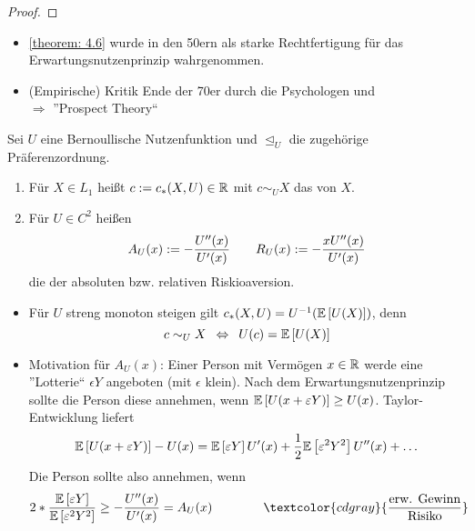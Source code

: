 \begin{proof}
\end{proof}

\begin{*bemerkung}
	\begin{itemize}[nolistsep]
		\item \cref{theorem: 4.6} wurde in den 50ern als starke Rechtfertigung für das Erwartungsnutzenprinzip wahrgenommen.
		\item (Empirische) Kritik Ende der 70er durch die Psychologen  und  \\
		$\Rightarrow$ ''Prospect Theory``
	\end{itemize}
\end{*bemerkung}

\begin{*definition}
	Sei $U$ eine Bernoullische Nutzenfunktion und $\unlhd_U$ die zugehörige Präferenzordnung.
	\begin{enumerate}[label=(\alph*)]
		\item Für $X \in L_1$ heißt $c \mathrel{:=} c_\ast(X,U) \in \mathbb{R}$ mit $c \sim_U X$ das  von $X$.
		\item Für $U \in C^2$ heißen
		\begin{equation*}
			A_U(x) \mathrel{:=} - \frac{U''(x)}{U'(x)} \qquad R_U(x) \mathrel{:=} -\frac{x U''(x)}{U'(x)}
		\end{equation*}
		die  der absoluten bzw. relativen Riskioaversion.
	\end{enumerate}
\end{*definition}

\begin{*bemerkung}
	\begin{itemize}
		\item Für $U$ streng monoton steigen gilt $c_\ast(X,U) = U^{-1}(\mathbb{E} \left[ U(X) \right])$, denn
		\begin{equation*}
			c \sim_U X \enskip \Leftrightarrow \enskip U(c) = \mathbb{E} \left[ U(X) \right]
		\end{equation*}
		\item Motivation für $A_U(x)$: Einer Person mit Vermögen $x \in \mathbb{R}$ werde eine ''Lotterie`` $\epsilon Y$ angeboten (mit $\epsilon$ klein). Nach dem Erwartungsnutzenprinzip sollte die Person diese annehmen, wenn $\mathbb{E} \left[ U(x + \varepsilon Y) \right] \ge U(x)$. Taylor-Entwicklung liefert
		\begin{equation*}
			\mathbb{E} \left[ U(x + \varepsilon Y) \right] - U(x) = \mathbb{E} \left[ \varepsilon Y \right] U'(x) + \frac{1}{2} \mathbb{E} \left[ \varepsilon^2 Y^2 \right] U''(x) + \dots
		\end{equation*}
		Die Person sollte also annehmen, wenn 
		\begin{equation*}
			2 * \frac{\EW[\epsilon Y]}{\EW[\epsilon^2 Y^2]} \ge - \frac{U''(x)}{U'(x)} = A_U(x) \qquad\qquad \textcolor{cdgray}{\frac{\text{erw. Gewinn}}{\text{Risiko}}}
		\end{equation*}
	\end{itemize}
\end{*bemerkung}


